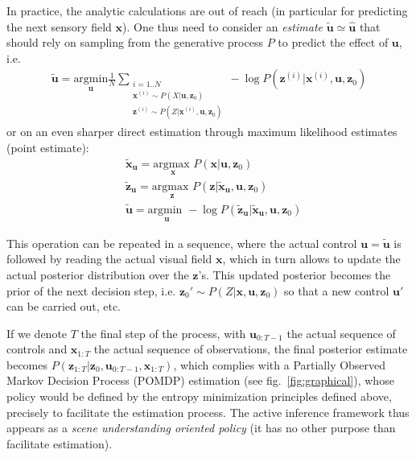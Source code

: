 \documentclass{article} %
\begin{document}
	In practice, the analytic calculations are out of reach (in particular for predicting the next sensory field $\boldsymbol{x}$).  One thus need to consider an \emph{estimate} $\tilde{\boldsymbol{u}} \simeq \hat{\boldsymbol{u}}$ that should rely on sampling from the generative process $P$ to 
	predict the effect of $\boldsymbol{u}$,  i.e. 
	\begin{align} \tilde{\boldsymbol{u}} = \underset{\boldsymbol{u}}{\text{argmin}} \frac{1}{N} \sum_{\substack{i = 1..N\\ \boldsymbol{x}^{(i)} \sim P(X|\boldsymbol{u}, \boldsymbol{z}_0)\\ \boldsymbol{z}^{(i)} \sim P(Z|\boldsymbol{x}^{(i)}, \boldsymbol{u}, \boldsymbol{z}_0)}} -\log P(\boldsymbol{z}^{(i)}| \boldsymbol{x}^{(i)}, \boldsymbol{u}, \boldsymbol{z}_0) \label{eq:MC} \end{align} or on an even sharper direct estimation through maximum likelihood estimates (point estimate):
	\begin{align}
	&\tilde{\boldsymbol{x}}_{\boldsymbol{u}} = \underset{\boldsymbol{x}}{\text{argmax }} P(\boldsymbol{x}|\boldsymbol{u}, \boldsymbol{z}_0) \label{eq:step-1}\\	
	&\tilde{\boldsymbol{z}}_{\boldsymbol{u}} = \underset{\boldsymbol{z}}{\text{argmax }} P(\boldsymbol{z}|\tilde{\boldsymbol{x}}_{\boldsymbol{u}}, \boldsymbol{u}, \boldsymbol{z}_0) \label{eq:step-2}\\
	&\tilde{\boldsymbol{u}} = \underset{\boldsymbol{u}}{\text{argmin }} - \log P(\tilde{\boldsymbol{z}}_{\boldsymbol{u}}|\tilde{\boldsymbol{x}}_{\boldsymbol{u}}, \boldsymbol{u}, \boldsymbol{z}_0)	\label{eq:step-3}
	\end{align}


This operation can be repeated in a sequence, where the actual control $\boldsymbol{u} = \tilde{\boldsymbol{u}}$ is followed by reading the actual visual field $\boldsymbol{x}$, which in turn allows to update the actual posterior distribution over the $\boldsymbol{z}$'s. This updated posterior becomes the prior of the next decision step, i.e. $\boldsymbol{z}_0'\sim  P(Z|\boldsymbol{x}, \boldsymbol{u}, \boldsymbol{z}_0)$ so that a new control $\boldsymbol{u}'$ can be carried out, etc. 

If we denote $T$ the final step of the process,  with $\boldsymbol{u}_{0:T-1}$ the actual sequence of controls and $\boldsymbol{x}_{1:T}$ the actual sequence of observations, the final posterior estimate becomes $P(\boldsymbol{z}_{1:T}|\boldsymbol{z}_0, \boldsymbol{u}_{0:T-1}, \boldsymbol{x}_{1:T})$, which complies with a Partially Observed Markov Decision Process (POMDP) estimation (see fig.~\ref{fig:graphical}), whose policy would be defined by the entropy minimization principles defined above, precisely to facilitate the estimation process. The active inference framework thus appears  as a \emph{scene understanding oriented policy} (it has no other purpose than facilitate estimation).
\end{document}
